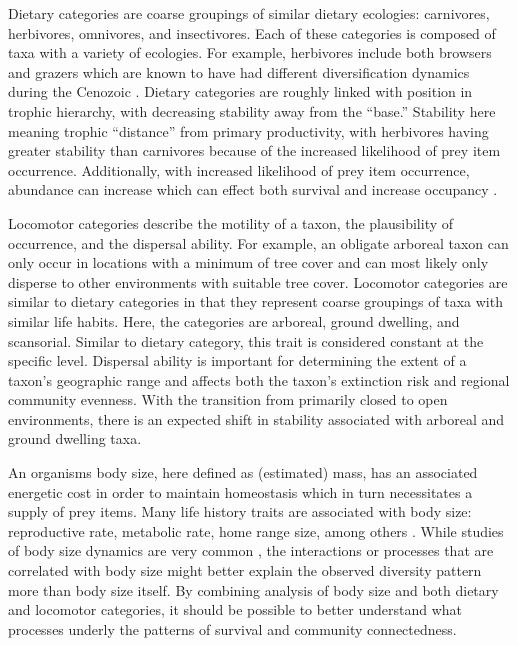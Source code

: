 \documentclass[12pt,letterpaper]{article}
\begin{document}
Dietary categories are coarse groupings of similar dietary ecologies: carnivores, herbivores, omnivores, and insectivores. Each of these categories is composed of taxa with a variety of ecologies. For example, herbivores include both browsers and grazers which are known to have had different diversification dynamics during the Cenozoic \citep{Janis2000}. Dietary categories are roughly linked with position in trophic hierarchy, with decreasing stability away from the ``base.'' Stability here meaning trophic ``distance'' from primary productivity, with herbivores having greater stability than carnivores because of the increased likelihood of prey item occurrence. Additionally, with increased likelihood of prey item occurrence, abundance can increase \citep{VanValen1989,Brown1987,Damuth1979,Silva1997,Janis2000} which can effect both survival and increase occupancy \citep{Jernvall2004,Brown1984,Jernvall2002,Fortelius2002}.

Locomotor categories describe the motility of a taxon, the plausibility of occurrence, and the dispersal ability. For example, an obligate arboreal taxon can only occur in locations with a minimum of tree cover and can most likely only disperse to other environments with suitable tree cover. Locomotor categories are similar to dietary categories in that they represent coarse groupings of taxa with similar life habits. Here, the categories are arboreal, ground dwelling, and scansorial. Similar to dietary category, this trait is considered constant at the specific level. Dispersal ability is important for determining the extent of a taxon's geographic range \citep{Birand2012,Jablonski2006a,Gaston2009} and affects both the taxon's extinction risk and regional community evenness. With the transition from primarily closed to open environments, there is an expected shift in stability associated with arboreal and ground dwelling taxa.

An organisms body size, here defined as (estimated) mass, has an associated energetic cost in order to maintain homeostasis which in turn necessitates a supply of prey items. Many life history traits are associated with body size: reproductive rate, metabolic rate, home range size, among others \cite{Peters1983a,Damuth1979,Brown1987,Smith2004}. While studies of body size dynamics are very common \citep{Clauset2008a,Damuth1981a,Johnson2002b,Liow2008,Alroy2000g}, the interactions or processes that are correlated with body size might better explain the observed diversity pattern more than body size itself. By combining analysis of body size and both dietary and locomotor categories, it should be possible to better understand what processes underly the patterns of survival and community connectedness.
\end{document}
